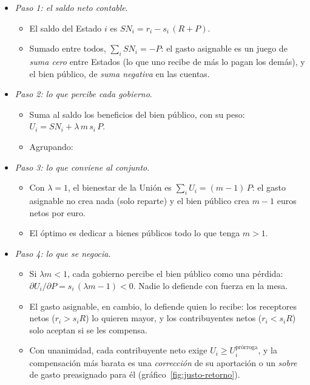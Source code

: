 \documentclass[11pt]{article}
\begin{document}
\begin{itemize}
\item \emph{Paso 1: el saldo neto contable}.
  \begin{itemize}
  \item El saldo del Estado $i$ es $SN_i=r_i-s_i\,(R+P)$.
  \item Sumado entre todos, $\sum_iSN_i=-P$: el gasto asignable es un juego de \emph{suma cero} entre Estados (lo que uno recibe de más lo pagan los demás), y el bien público, de \emph{suma negativa} en las cuentas.
  \end{itemize}
\item \emph{Paso 2: lo que percibe cada gobierno}.
  \begin{itemize}
  \item Suma al saldo los beneficios del bien público, con su peso: $U_i=SN_i+\lambda\,m\,s_i\,P$.
  \item Agrupando:
  \end{itemize}
\item \emph{Paso 3: lo que conviene al conjunto}.
  \begin{itemize}
  \item Con $\lambda=1$, el bienestar de la Unión es $\sum_iU_i=(m-1)\,P$: el gasto asignable no crea nada (solo reparte) y el bien público crea $m-1$ euros netos por euro.
  \item El óptimo es dedicar a bienes públicos todo lo que tenga $m>1$.
  \end{itemize}
\item \emph{Paso 4: lo que se negocia}.
  \begin{itemize}
  \item Si $\lambda m<1$, cada gobierno percibe el bien público como una pérdida: $\partial U_i/\partial P=s_i\,(\lambda m-1)<0$. Nadie lo defiende con fuerza en la mesa.
  \item El gasto asignable, en cambio, lo defiende quien lo recibe: los receptores netos ($r_i>s_iR$) lo quieren mayor, y los contribuyentes netos ($r_i<s_iR$) solo aceptan si se les compensa.
  \item Con unanimidad, cada contribuyente neto exige $U_i\geq U_i^{\text{prórroga}}$, y la compensación más barata es una \emph{corrección} de su aportación o un \emph{sobre} de gasto preasignado para él (gráfico~\ref{fig:justo-retorno}).
  \end{itemize}
\end{itemize}
\end{document}
